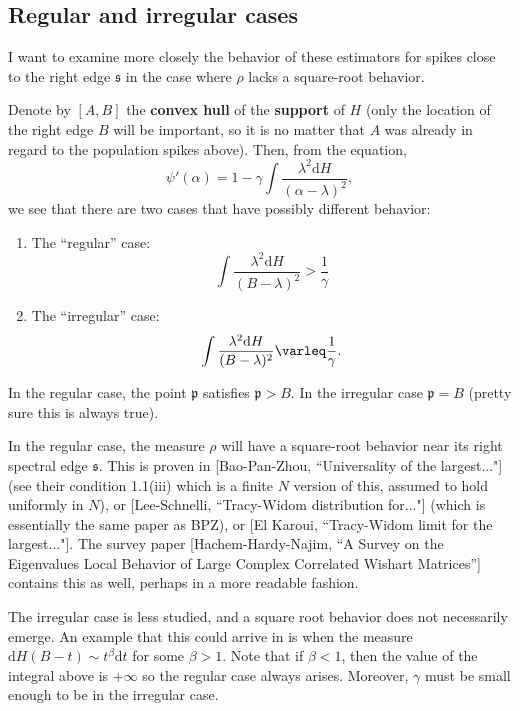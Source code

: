 \documentclass[11 pt, reqno]{article}
\def\beq{\begin{equation}}
\def\eeq{\end{equation}}
\def\mfp{\mathfrak{p}}
\def\mfs{\mathfrak{s}}
\def\d{\mathrm{d}}
\renewcommand\leq\varleq
\begin{document}
\subsection{Regular and irregular cases}
I want to examine more closely the behavior of these estimators for spikes close to the right edge $\mfs$ in the case where $\rho$ lacks a square-root behavior.







Denote by $[A, B]$ the {\bf convex hull} of the {\bf support} of $H$ (only the location of the right edge $B$ will be important, so it is no matter that $A$ was already in regard to the population spikes above).  Then, from the equation,
\beq
\psi' (\alpha ) = 1 - \gamma \int \frac{ \lambda^2 \d H }{ (  \alpha - \lambda)^2},
\eeq
we see that there are two cases that have possibly different behavior:
\begin{enumerate}
\item The ``regular'' case:
\beq
 \int \frac{ \lambda^2 \d H }{ ( B- \lambda )^2 } > \frac{1}{ \gamma} 
\eeq
\item The ``irregular'' case:
\beq \label{eqn:irreg}
\int \frac{ \lambda^2 \d H }{ ( B - \lambda)^2 } \leq \frac{1}{ \gamma}.
\eeq

\end{enumerate}
In the regular case, the point $\mfp$ satisfies $\mfp > B$.  In the irregular case $\mfp = B$ (pretty sure this is always true). 

In the regular case, the measure $\rho$ will have a square-root behavior near its right spectral edge $\mfs$.  This is proven in [Bao-Pan-Zhou, ``Universality of the largest..."] (see their condition 1.1(iii) which is a finite $N$ version of this, assumed to hold uniformly in $N$), or [Lee-Schnelli, ``Tracy-Widom distribution for..."] (which is essentially the same paper as BPZ), or [El Karoui, ``Tracy-Widom limit for the largest..."].  The survey paper [Hachem-Hardy-Najim, ``A Survey on the Eigenvalues Local Behavior of
Large Complex Correlated Wishart Matrices''] contains this as well, perhaps in a more readable fashion.

The irregular case is less studied, and a square root behavior does not necessarily emerge.  An example that this could arrive in is when the measure $\d H (B-t) \sim t^\beta \d t $ for some $\beta >1$.  Note that if $\beta < 1$, then the value of the integral above is $+ \infty$ so the regular case always arises.  Moreover, $\gamma$ must be small enough to be in the irregular case.
\end{document}
